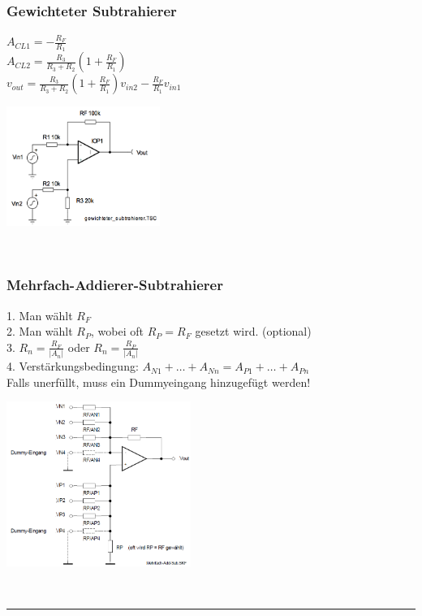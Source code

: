 		\begin{minipage}[c]{12cm}
		\subsubsection{Gewichteter Subtrahierer}
            	$A_{CL1}=- \frac{R_F}{R_1}$\\
            	$A_{CL2}=
           		\frac{R_3}{R_3+R_2}\left(1+\frac{R_F}{R_1}\right)$\\
            	$v_{out}=
            	\frac{R_3}{R_3+R_2}\left(1+\frac{R_F}{R_1}\right)
            	v_{in2}-\frac{R_F}{R_1}v_{in1}$\\
      	\end{minipage}
			\begin{minipage}{5cm}
            	\includegraphics[width=5cm]{./images/gewichtsub.png}
            \end{minipage}\\


		\begin{minipage}[b]{12cm}
		\subsubsection{Mehrfach-Addierer-Subtrahierer} 		
			1. Man wählt $R_{F}$\\
			2. Man wählt $R_{P}$, wobei oft $R_{P}=R_{F}$ gesetzt wird. (optional)\\
			3. $R_{n}=\frac{R_{F}}{\left|A_{n}\right|}$ oder
				$R_{n}=\frac{R_{P}}{\left|A_{n}\right|}$\\ 
			4. Verstärkungsbedingung: $A_{N1} +
			\ldots + A_{Nn} = A_{P1} + \ldots + A_{Pn}$ \\Falls unerfüllt, muss ein Dummyeingang hinzugefügt werden!
		\end{minipage}
		\begin{minipage}{6cm}
          	\includegraphics[width=6cm]{./images/mehrfach-addierer-subtrahierer.png} 
        \end{minipage}\\
\hrule

